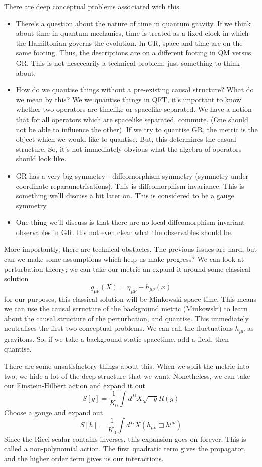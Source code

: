 \documentclass[11pt, oneside]{article}   	%
\theoremstyle{slanted}
\begin{document}
There are deep conceptual problems associated with this. 
\begin{itemize}
\item  There's a question about the 
	nature of time in quantum gravity. 
If we think about time in quantum mechanics, time 
is treated as a fixed clock in which the Hamiltonian 
governs the evolution. In GR, space and time are on the same footing. 
Thus, the descriptions are on a different footing 
in QM versus GR. This is not neseccarily a technical problem, 
just something to think about. 
\item How do we quantise things without a pre-existing causal structure? 
What do we mean by this? We we quantise things in QFT, 
it's important to know whether two operators 
are timelike or spacelike separated. We have a notion 
that for all operators which are spacelike separated, 
commute. (One should not be able to influence the other). 
If we try to quantise GR, the metric is the object which 
we would like to quantise. But, this determines the casual 
structure. So, it's not immediately obvious 
what the algebra of operators should look like. 

\item GR has a very big symmetry - diffeomorphism symmetry (symmetry under
coordinate reparametrisations). This is diffeomorphism 
invariance. This is something we'll discuss a bit later on. 
This is considered to be a gauge symmetry. 
\item One thing we'll discuss is that there are no local 
diffeomorphism invariant observables in GR. It's 
not even clear what the observables should be. 
\end{itemize}

More importantly, 
there are technical obstacles. The previous issues are hard, 
but can we make some assumptions which help us make progress? 
We can look at perturbation theory; we can take our 
metric an expand it around some classical solution
\[
g _{ \mu \nu } \left( X  \right)   = \eta _{ \mu \nu } + h _{ \mu \nu } \left( x \right) 
\] for our purposes, this classical solution will be 
Minkowski space-time. 
This means we can use the causal structure of 
the background metric (Minkowski) to 
learn about the causal structure of the perturbation, 
and quantise. 
This immediately neutralises the first two 
conceptual problems. We can call the fluctuations $ h _{ \mu \nu } $ 
as gravitons. 
So, if we take a background static spacetime, add a field, 
then quantise. 

There are some unsatisfactory things about this. 
When we split the metric into two, 
we hide a lot of the deep structure that we want. 
Nonetheless, we can take our Einstein-Hilbert action and expand it out
\[
S \left[ g  \right]   = \frac{1}{K_ 0 } \int d ^{ D } X \sqrt{  - g }  R ( g ) 
\] Choose a gauge and expand out 
\[
S \left[  h  \right]   = \frac{1}{K_0 } \int  d ^ D X \left( 
h _{ \mu \nu } \Box h ^{ \mu \nu } \right) 
\] Since the Ricci scalar contains inverses, 
this expansion goes on forever. This is called 
a non-polynomial action. 
The first quadratic term gives the propagator, 
and the higher order term gives us our interactions. 
\end{document}
